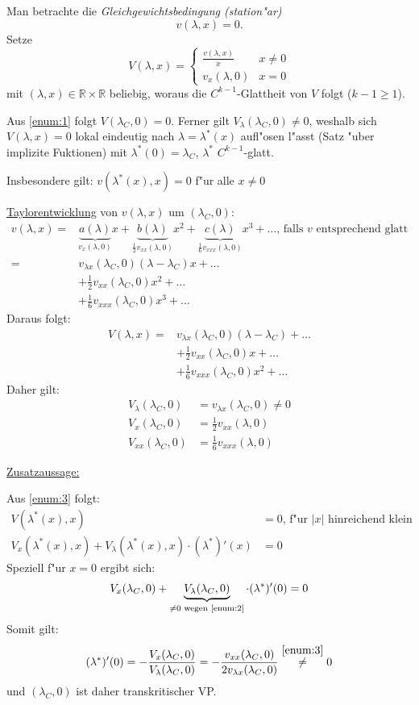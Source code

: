 \documentclass[a4paper, 13pt]{scrreprt}
\theoremstyle{definition} \newtheorem{definition}{Definition}[section]
\newenvironment{beweis}[1][Beweis]{\begin{trivlist}
\item[\hskip \labelsep {\bfseries #1}]}{\end{trivlist}}
\newcommand{\RR}{\mathbb{R}}
\begin{document}
\begin{beweis}
Man betrachte die \emph{Gleichgewichtsbedingung (station"ar)}
\[
v(\lambda,x) = 0.
\]
Setze
\[
V(\lambda,x) =
\begin{cases}
\frac{v(\lambda,x)}{x} & x\neq 0\\
v_x(\lambda,0) & x = 0
\end{cases}
\]
mit $(\lambda,x)\in\RR\times\RR$ beliebig, woraus die $C^{k-1}$-Glattheit von $V$ folgt ($k-1\geq 1$).

Aus \ref{enum:1} folgt $V(\lambda_C,0) = 0$. Ferner gilt $V_\lambda(\lambda_C,0)\neq 0$, weshalb sich $V(\lambda,x) = 0$ lokal eindeutig nach  $\lambda = \lambda^*(x)$ aufl"osen l"asst (Satz "uber implizite Fuktionen) mit $\lambda^*(0) = \lambda_C$, $\lambda^*$ $C^{k-1}$-glatt.

Insbesondere gilt: $v(\lambda^*(x),x) = 0$ f"ur alle $x\neq 0$

\underline{Taylorentwicklung} von $v(\lambda,x)$ um $(\lambda_C,0)$:
\begin{align*}
v(\lambda,x)=&\underbrace{a(\lambda)}_{v_x(\lambda,0)}x + \underbrace{b(\lambda)}_{\frac{1}{2}v_{xx}(\lambda,0)}x^2 + \underbrace{c(\lambda)}_{\frac{1}{6}v_{xxx}(\lambda,0)}x^3 + \dots\text{, falls } v \text{ entsprechend glatt}\\
=& v_{\lambda x}(\lambda_C,0)(\lambda-\lambda_C)x +\dots\\
&+ \frac{1}{2}v_{xx}(\lambda_C,0)x^2 + \dots\\
&+ \frac{1}{6}v_{xxx}(\lambda_C,0)x^3 + \dots
\end{align*}
Daraus folgt:
\begin{align*}
V(\lambda,x) =&  v_{\lambda x}(\lambda_C,0)(\lambda - \lambda_C) + \dots \\
&+ \frac{1}{2}v_{xx}(\lambda_C,0)x + \dots\\
&+\frac{1}{6}v_{xxx}(\lambda_C,0)x^2 + \dots
\end{align*}
Daher gilt:
\begin{align*}
V_\lambda(\lambda_C,0) &= v_{\lambda x}(\lambda_C,0)\neq 0\\
V_x(\lambda_C,0) &= \frac{1}{2}v_{xx}(\lambda,0)\\
V_{xx}(\lambda_C,0) &= \frac{1}{6}v_{xxx}(\lambda,0)
\end{align*}

\underline{Zusatzaussage:}

Aus \ref{enum:3} folgt:
\begin{align*}
V(\lambda^*(x),x) &= 0\text{, f"ur } |x| \text{ hinreichend klein}\\
V_x(\lambda^*(x),x) + V_\lambda(\lambda^*(x),x)\cdot(\lambda^*)'(x) &= 0
\end{align*}
Speziell f"ur $x=0$ ergibt sich:
\[
V_x(\lambda_C,0) + \underbrace{V_\lambda(\lambda_C,0)}_{\neq 0\text{ wegen \ref{enum:2}}}\cdot(\lambda^*)'(0) = 0
\]
Somit gilt:
\[
(\lambda^*)'(0) = -\frac{V_x(\lambda_C,0)}{V_\lambda(\lambda_C,0)} = -\frac{v_{xx}(\lambda_C,0)}{2v_{\lambda x}(\lambda_C,0)}\stackrel{\ref{enum:3}}{\neq}0
\]
und $(\lambda_C,0)$ ist daher transkritischer VP.


\end{beweis}
\end{document}
